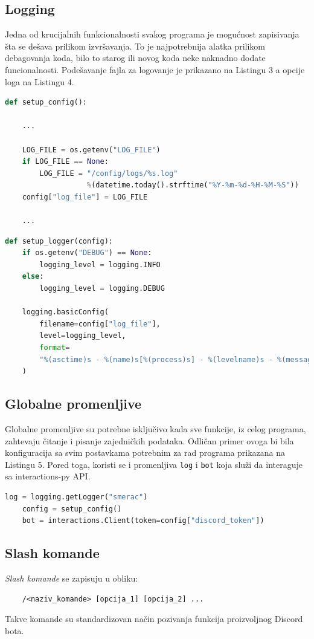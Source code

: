 \documentclass[a4paper,11pt]{article}
\begin{document}
\subsection{Logging}
Jedna od krucijalnih funkcionalnosti svakog programa je mogućnost zapisivanja šta se dešava prilikom izvršavanja. To je najpotrebnija alatka prilikom debagovanja koda, bilo to starog ili novog koda neke naknadno dodate funcionalnosti. Podešavanje fajla za logovanje je prikazano na Listingu 3 a opcije loga na Listingu 4.
\begin{lstlisting}[language=Python, caption=Podešavanje fajla za logovanje]
def setup_config():
    
    ...

    LOG_FILE = os.getenv("LOG_FILE")
    if LOG_FILE == None:
        LOG_FILE = "/config/logs/%s.log"
                   %(datetime.today().strftime("%Y-%m-%d-%H-%M-%S"))
    config["log_file"] = LOG_FILE
    
    ...
\end{lstlisting}
\begin{lstlisting}[language=Python, caption=Opcije loga]
def setup_logger(config):
    if os.getenv("DEBUG") == None:
        logging_level = logging.INFO
    else:
        logging_level = logging.DEBUG

    logging.basicConfig(
        filename=config["log_file"],
        level=logging_level,
        format=
        "%(asctime)s - %(name)s[%(process)s] - %(levelname)s - %(message)s",
    )
\end{lstlisting}
\subsection{Globalne promenljive}
Globalne promenljive su potrebne isključivo kada sve funkcije, iz celog programa, zahtevaju čitanje i pisanje zajedničkih podataka. Odličan primer ovoga bi bila konfiguracija sa svim postavkama potrebnim za rad programa prikazana na Listingu 5. Pored toga, koristi se i promenljiva \texttt{log} i \texttt{bot} koja služi da interaguje sa interactions-py API.
\begin{lstlisting}[language=Python, caption=Globalne promenljive]
    log = logging.getLogger("smerac")
    config = setup_config()
    bot = interactions.Client(token=config["discord_token"])
\end{lstlisting}
\newpage
\subsection{Slash komande}
\textit{Slash komande} se zapisuju u obliku:
\begin{verbatim}
    /<naziv_komande> [opcija_1] [opcija_2] ...
\end{verbatim}
Takve komande su standardizovan način pozivanja funkcija proizvoljnog Discord bota.
\end{document}
